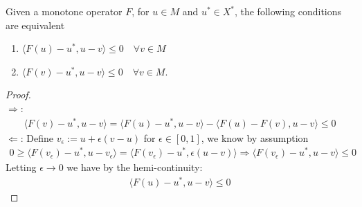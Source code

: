 \begin{lemma}[Minty]
	Given a monotone operator $F$, for $u \in M$ and $u^* \in X^*$, the following conditions are equivalent
	\begin{enumerate}
		\item $ \langle F(u) - u^*, u - v \rangle \le 0 \quad \forall v \in M$
		\item $\langle F(v) - u^*, u - v \rangle \le 0 \quad \forall v \in  M$.  
	\end{enumerate}
\end{lemma}
\begin{proof}
	\quad\\
	$\Rightarrow$: 
	\begin{align*}
		\langle F(v) - u^*, u - v \rangle = 
		\langle F(u) - u^*, u - v \rangle - \langle F(u) - F(v), u - v \rangle \le 0
	\end{align*}
	$\Leftarrow$: Define $v_\epsilon:= u + \epsilon( v - u)$ for $\epsilon \in [0, 1]$,  we know by assumption
	\begin{align*}
	 	0 \ge \langle F(v_\epsilon) - u^*, u - v_\epsilon \rangle = \langle F(v_\epsilon) - u^*, \epsilon (u - v) \rangle 
	 	\Rightarrow \langle F(v_\epsilon) -  u^*, u - v\rangle \le 0
	\end{align*}
	Letting $\epsilon \rightarrow 0$ we have by the hemi-continuity:
	\begin{align*}
		\langle F(u) - u^*, u - v \rangle \le 0
	\end{align*}
\end{proof}


